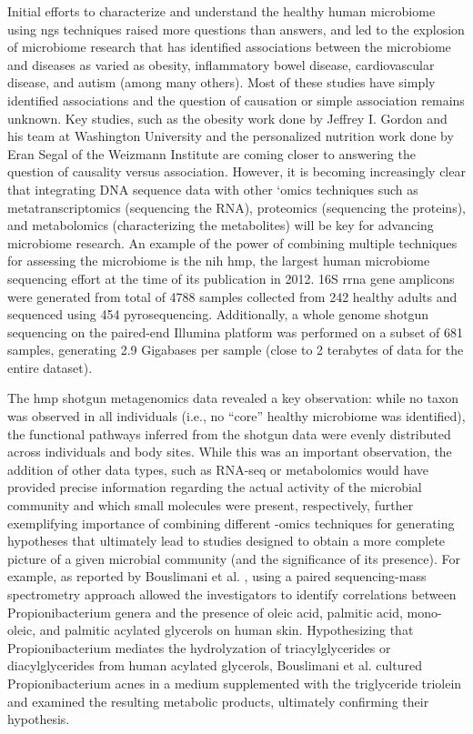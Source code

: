 Initial efforts to characterize and understand the healthy human microbiome using \gls{ngs} techniques \cite{TheHumanMicrobiomeProjectConsortium2012, Consortium2012} raised more questions than answers, and led to the explosion of microbiome research that has identified associations between the microbiome and diseases as varied as obesity, inflammatory bowel disease, cardiovascular disease, and autism (among many others). Most of these studies have simply identified associations and the question of causation or simple association remains unknown. Key studies, such as the obesity work done by Jeffrey I. Gordon and his team at Washington University \cite{Turnbaugh2006, Turnbaugh2009, Ridaura2013} and the personalized nutrition work done by Eran Segal of the Weizmann Institute \cite{Zeevi2017} are coming closer to answering the question of causality versus association. However, it is becoming increasingly clear that integrating DNA sequence data with other ‘omics techniques such as metatranscriptomics (sequencing the RNA), proteomics (sequencing the proteins), and metabolomics (characterizing the metabolites) will be key for advancing microbiome research. An example of the power of combining multiple techniques for assessing the microbiome is the \gls{nih} \gls{hmp}, the largest human microbiome sequencing effort at the time of its publication in 2012. 16S \gls{rrna} gene amplicons were generated from total of 4788 samples collected from 242 healthy adults \cite{TheHumanMicrobiomeProjectConsortium2012} and sequenced using 454 pyrosequencing. Additionally, a whole genome shotgun sequencing on the paired-end Illumina platform was performed on a subset of 681 samples, generating 2.9 Gigabases per sample (close to 2 terabytes of data for the entire dataset).

The \gls{hmp} shotgun metagenomics data revealed a key observation: while no taxon was observed in all individuals (i.e., no “core” healthy microbiome was identified), the functional pathways inferred from the shotgun data were evenly distributed across individuals and body sites. While this was an important observation, the addition of other data types, such as RNA-seq or metabolomics would have provided precise information regarding the actual activity of the microbial community and which small molecules were present, respectively, further exemplifying importance of combining different -omics techniques for generating hypotheses that ultimately lead to studies designed to obtain a more complete picture of a given microbial community (and the significance of its presence). For example, as reported by Bouslimani et al. \cite{Bouslimani2015}, using a paired sequencing-mass spectrometry approach allowed the investigators to identify correlations between Propionibacterium genera and the presence of oleic acid, palmitic acid, mono-oleic, and palmitic acylated glycerols on human skin. Hypothesizing that Propionibacterium mediates the hydrolyzation of triacylglycerides or diacylglycerides from human acylated glycerols, Bouslimani et al. cultured Propionibacterium acnes in a medium supplemented with the triglyceride triolein and examined the resulting metabolic products, ultimately confirming their hypothesis.

